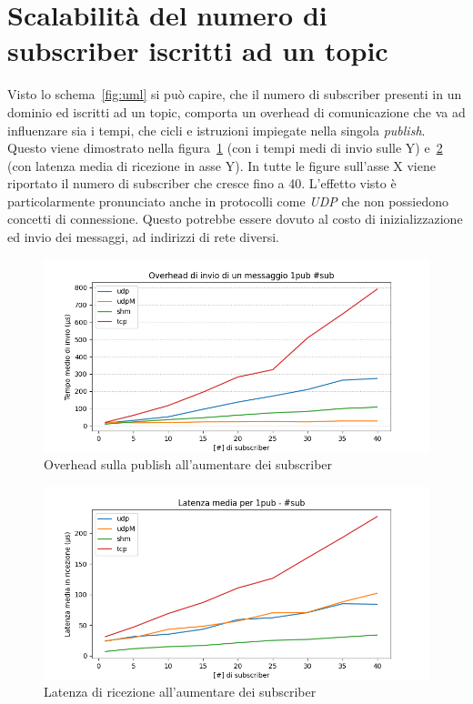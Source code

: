 \section{Scalabilità del numero di subscriber iscritti ad un topic}
Visto lo schema~\ref{fig:uml} si può capire, che il numero di subscriber presenti in un dominio ed iscritti ad un topic, comporta un overhead di comunicazione che va ad influenzare sia i tempi, che cicli e istruzioni impiegate nella singola \emph{publish}. Questo viene dimostrato nella figura~\ref{fig:test3_overhead} (con i tempi medi di invio sulle Y) e~\ref{fig:test3_latenza} (con latenza media di ricezione in asse Y). In tutte le figure sull'asse X viene riportato il numero di subscriber che cresce fino a 40. L'effetto visto è particolarmente pronunciato anche in protocolli come \emph{UDP} che non possiedono concetti di connessione. Questo potrebbe essere dovuto al costo di inizializzazione ed invio dei messaggi, ad indirizzi di rete diversi.
\begin{figure}[H]
    \centering
    \includegraphics[width=\textwidth]{./results/test3_sending_multiplesub.png}
    \caption{Overhead sulla publish all'aumentare dei subscriber}\label{fig:test3_overhead}
\end{figure}
\begin{figure}[H]
    \centering
    \includegraphics[width=\textwidth]{./results/test3_sendingreceiving_multiplesub.png} 
    \caption{Latenza di ricezione all'aumentare dei subscriber}\label{fig:test3_latenza}
\end{figure}


